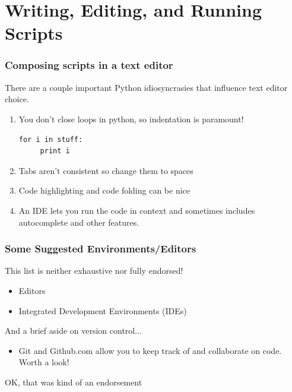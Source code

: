 \documentclass{beamer}
\begin{document}
\section[]{Writing, Editing, and Running Scripts}
\begin{frame}[fragile]
\frametitle{Composing scripts in a text editor}
There are a couple important Python idiosyncrasies that influence text editor choice.
\begin{enumerate}
\item You don't close loops in python, so indentation is paramount!
\pause
\begin{lstlisting}
for i in stuff:
     print i
\end{lstlisting}
\pause
\item Tabs aren't consistent so change them to spaces
\item Code highlighting and code folding can be nice
\pause
\item An IDE lets you run the code in context and sometimes includes autocomplete and other features.

\end{enumerate}
\end{frame}

\begin{frame}[fragile]
\frametitle{Some Suggested Environments/Editors}
This list is neither exhaustive nor fully endorsed!
\begin{itemize}
\item Editors
\item Integrated Development Environments (IDEs)
\end{itemize}
\pause
And a brief aside on version control...
\begin{itemize}
\item Git and Github.com allow you to keep track of and collaborate on code. Worth a look!
\end{itemize}
\pause
\begin{tiny}
OK, that was kind of an endorsement
\end{tiny}
\end{frame}
\end{document}

